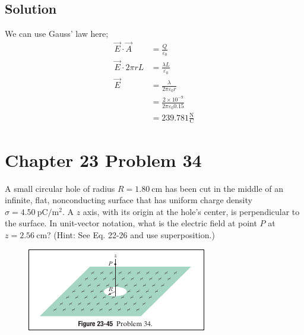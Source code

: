 \documentclass{article}
\newcommand{\m}{\text{m}}
\newcommand{\centi}{\text{c}}
\newcommand{\N}{\text{N}}
\newcommand{\C}{\text{C}}
\begin{document}
\subsection*{Solution}
We can use Gauss' law here;
\begin{align*}
    \vec{E} \cdot \vec{A} &= \frac{Q}{\varepsilon_0} \\
    \vec{E} \cdot 2\pi r L &= \frac{\lambda L}{\varepsilon_0} \\
    \vec{E} &= \frac{\lambda}{2\pi \varepsilon_0 r} \\
    &= \frac{2 \times 10^{-9}}{2\pi \varepsilon_0 0.15} \\
    &= \boxed{239.781 \frac{\N}{\C}}
\end{align*}


\section*{Chapter 23 Problem 34}
A small circular hole of radius $R = 1.80\ \centi \m$ has been cut in the middle of an infinite, flat, nonconducting surface that has uniform charge density $\sigma = 4.50\ \text{p}\C/\m^2$. A $z$ axis, with its origin at the hole's center, is perpendicular to the surface. In unit-vector notation, what is the electric field at point $P$ at $z = 2.56\ \centi \m$?
(Hint: See Eq. 22-26 and use superposition.)

\begin{figure}[ht]
    \centering
    \includegraphics[scale=0.75]{image-5.png}
\end{figure}
\end{document}
